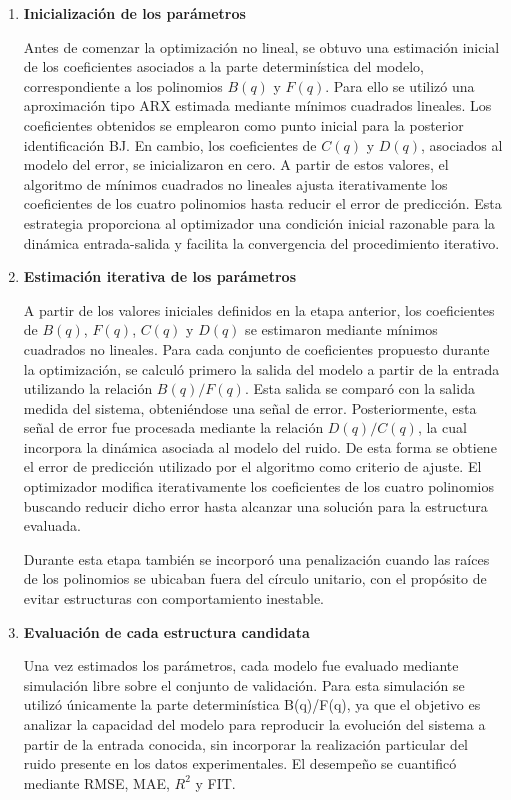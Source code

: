 \documentclass[11pt]{report}
\begin{document}
\begin{enumerate}
    

\item \textbf{Inicialización de los parámetros}

Antes de comenzar la optimización no lineal, se obtuvo una estimación inicial de los coeficientes asociados a la parte determinística del modelo, correspondiente a los polinomios $B(q)$ y $F(q)$. Para ello se utilizó una aproximación tipo ARX estimada mediante mínimos cuadrados lineales. Los coeficientes obtenidos se emplearon como punto inicial para la posterior identificación BJ. En cambio, los coeficientes de $C(q)$ y $D(q)$, asociados al modelo del error, se inicializaron en cero. A partir de estos valores, el algoritmo de mínimos cuadrados no lineales ajusta iterativamente los coeficientes de los cuatro polinomios hasta reducir el error de predicción.
Esta estrategia proporciona al optimizador una condición inicial razonable para la dinámica entrada-salida y facilita la convergencia del procedimiento iterativo.


\item \textbf{Estimación iterativa de los parámetros}


A partir de los valores iniciales definidos en la etapa anterior, los coeficientes de $B(q)$, $F(q)$, $C(q)$ y $D(q)$ se estimaron mediante mínimos cuadrados no lineales. Para cada conjunto de coeficientes propuesto durante la optimización, se calculó primero la salida del modelo a partir de la entrada utilizando la relación $B(q)/F(q)$. Esta salida se comparó con la salida medida del sistema, obteniéndose una señal de error.
Posteriormente, esta señal de error fue procesada mediante la relación $D(q)/C(q)$, la cual incorpora la dinámica asociada al modelo del ruido. De esta forma se obtiene el error de predicción utilizado por el algoritmo como criterio de ajuste. El optimizador modifica iterativamente los coeficientes de los cuatro polinomios buscando reducir dicho error hasta alcanzar una solución para la estructura evaluada.

Durante esta etapa también se incorporó una penalización cuando las raíces de los polinomios se ubicaban fuera del círculo unitario, con el propósito de evitar estructuras con comportamiento inestable.

\item \textbf{Evaluación de cada estructura candidata}
    
    Una vez estimados los parámetros, cada modelo fue evaluado mediante simulación libre sobre el conjunto de validación. Para esta simulación se utilizó únicamente la parte determinística B(q)/F(q), ya que el objetivo es analizar la capacidad del modelo para reproducir la evolución del sistema a partir de la entrada conocida, sin incorporar la realización particular del ruido presente en los datos experimentales. El desempeño se cuantificó mediante RMSE, MAE, $R^2$ y FIT.


\end{enumerate}
\end{document}
